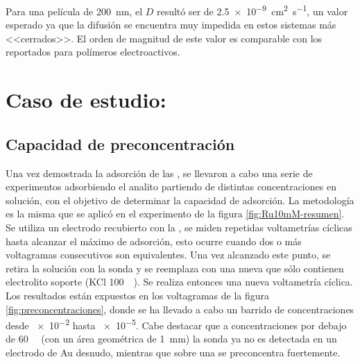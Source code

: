 		Para una película de \SI{200}{nm}, el $D$ resultó ser de \SI{2.5e-9}{\square\cm\per\second}, un valor esperado ya que la difusión se encuentra muy impedida en estos sistemas más <<cerrados>>. El orden de magnitud de este valor es comparable con los reportados para polímeros electroactivos.\cite{Kolb1993}
			
\section{Caso de estudio: \texorpdfstring{\aminorutenioCompleto}{Ru(NH3)CL3}}
	
	\subsection{Capacidad de preconcentración}

		Una vez demostrada la adsorción \ru\space de las \pdm, se llevaron a cabo una serie de experimentos adsorbiendo el analito partiendo de distintas concentraciones en solución, con el objetivo de determinar la capacidad de adsorción. La metodología es la misma que se aplicó en el experimento de la figura \ref{fig:Ru10mM-resumen}. Se utiliza un electrodo recubierto con la \pdmF, se miden repetidas voltametrías cíclicas hasta alcanzar el máximo de adsorción, esto ocurre cuando dos o más voltagramas consecutivos son equivalentes. Una vez alcanzado este punto, se retira la solución con la sonda y se reemplaza con una nueva que sólo contienen electrolito soporte (KCl \SI{100}{\milli\Molar}). Se realiza entonces una nueva voltametría cíclica. Los resultados están expuestos en los voltagramas de la figura \ref{fig:preconcentraciones}, donde se ha llevado a cabo un barrido de concentraciones desde \SI{e-2}{\Molar} hasta \SI{e-5}{\Molar}. Cabe destacar que a concentraciones por debajo de \SI{60}{\micro\Molar} (con un área geométrica de \SI{1}{mm}) la sonda ya no es detectada en un electrodo de Au desnudo, mientras que sobre una \pdm\space se preconcentra fuertemente.


